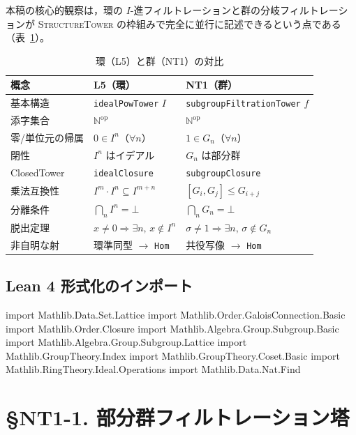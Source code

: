 \documentclass[a4paper,11pt]{ltjsarticle}
\theoremstyle{definition}
\theoremstyle{plain}
\theoremstyle{remark}
\begin{document}
本稿の核心的観察は，環の $I$-進フィルトレーションと群の分岐フィルトレーションが
\textsc{StructureTower} の枠組みで完全に並行に記述できるという点である（表~\ref{tab:parallel}）。

\begin{table}[H]
\centering
\caption{環（L5）と群（NT1）の対比}
\label{tab:parallel}
\renewcommand{\arraystretch}{1.3}
\begin{tabular}{lll}
\toprule
\textbf{概念} & \textbf{L5（環）} & \textbf{NT1（群）} \\
\midrule
基本構造 & \texttt{idealPowTower} $I$ & \texttt{subgroupFiltrationTower} $f$ \\
添字集合 & $\mathbb{N}^{\mathrm{op}}$ & $\mathbb{N}^{\mathrm{op}}$ \\
零/単位元の帰属 & $0 \in I^n$（$\forall n$） & $1 \in G_n$（$\forall n$） \\
閉性 & $I^n$ はイデアル & $G_n$ は部分群 \\
ClosedTower & \texttt{idealClosure} & \texttt{subgroupClosure} \\
乗法互換性 & $I^m \cdot I^n \subseteq I^{m+n}$ & $[G_i,G_j] \leq G_{i+j}$ \\
分離条件 & $\bigcap_n I^n = \bot$ & $\bigcap_n G_n = \bot$ \\
脱出定理 & $x \neq 0 \Rightarrow \exists n,\,x \notin I^n$ & $\sigma \neq 1 \Rightarrow \exists n,\,\sigma \notin G_n$ \\
非自明な射 & 環準同型 $\to$ \texttt{Hom} & 共役写像 $\to$ \texttt{Hom} \\
\bottomrule
\end{tabular}
\end{table}

\subsection{Lean 4 形式化のインポート}

\begin{leancode}
import Mathlib.Data.Set.Lattice
import Mathlib.Order.GaloisConnection.Basic
import Mathlib.Order.Closure
import Mathlib.Algebra.Group.Subgroup.Basic
import Mathlib.Algebra.Group.Subgroup.Lattice
import Mathlib.GroupTheory.Index
import Mathlib.GroupTheory.Coset.Basic
import Mathlib.RingTheory.Ideal.Operations
import Mathlib.Data.Nat.Find
\end{leancode}

\section{§NT1-1. 部分群フィルトレーション塔}
\end{document}
